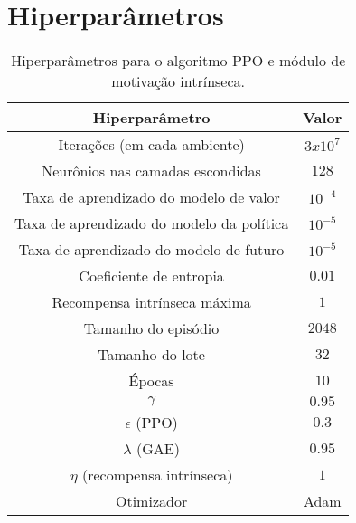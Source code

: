 \chapter{Hiperparâmetros}
\label{apend:1}

\begin{table*}[ht]
\centering
\caption{Hiperparâmetros para o algoritmo PPO e módulo de motivação intrínseca.}
\label{tab:hiperparameters} 
\begin{tabular}{|c|c|}
\hline Hiperparâmetro & Valor \\
\hline Iterações (em cada ambiente) & $3x10^7$ \\
\hline Neurônios nas camadas escondidas & $128$ \\ 
\hline Taxa de aprendizado do modelo de valor & $10^{-4}$ \\
\hline Taxa de aprendizado do modelo da política & $10^{-5}$ \\
\hline Taxa de aprendizado do modelo de futuro & $10^{-5}$ \\
\hline Coeficiente de entropia & $0.01$ \\ 
\hline Recompensa intrínseca máxima & $1$ \\
\hline Tamanho do episódio & $2048$ \\ 
\hline Tamanho do lote & $32$ \\ 
\hline Épocas & $10$ \\ 
\hline $\gamma$ & $0.95$ \\ 
\hline $\epsilon$ (PPO) & $0.3$ \\
\hline $\lambda$ (GAE) & $0.95$ \\
\hline $\eta$ (recompensa intrínseca) & $1$ \\
\hline Otimizador & Adam \\
\hline 
\end{tabular} 
\end{table*}